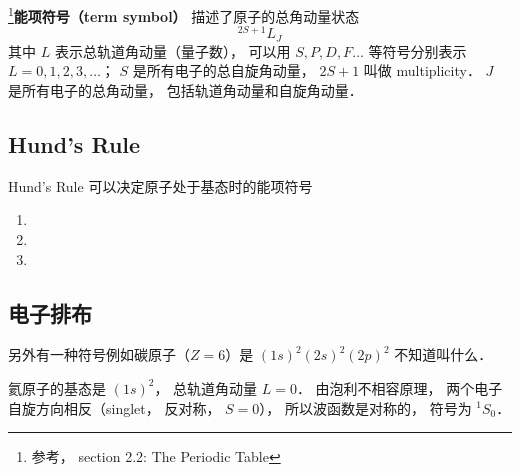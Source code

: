 

\footnote{参考\cite{GriffQ}， section 2.2: The Periodic Table}\textbf{能项符号（term symbol）} 描述了原子的总角动量状态
\begin{equation}
^{2S + 1} L_J
\end{equation}
其中 $L$ 表示总轨道角动量（量子数）， 可以用 $S, P, D, F \dots$ 等符号分别表示 $L = 0, 1, 2, 3, \dots$； $S$ 是所有电子的总自旋角动量， $2S + 1$ 叫做 multiplicity． $J$ 是所有电子的总角动量， 包括轨道角动量和自旋角动量．

\subsection{Hund's Rule}
Hund's Rule 可以决定原子处于基态时的能项符号
\begin{enumerate}
\item 
\item 
\item 
\end{enumerate}

\subsection{电子排布}
另外有一种符号例如碳原子（$Z = 6$）是 $(1s)^2 (2s)^2 (2p)^2$ 不知道叫什么．

氦原子的基态是 $(1s)^2$， 总轨道角动量 $L = 0$． 由泡利不相容原理， 两个电子自旋方向相反（singlet， 反对称， $S = 0$）， 所以波函数是对称的， 符号为 $^1 S_0$．
